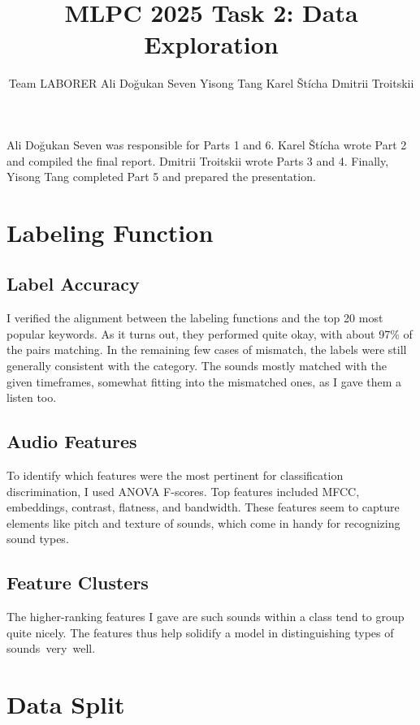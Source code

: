 \documentclass{article}
\title{MLPC 2025 Task 2: Data Exploration}
\author{%
  Team LABORER \AND
  Ali Doğukan Seven
  \And
  Yisong Tang
  \And 
  Karel Štícha
  \AND 
  Dmitrii Troitskii
}
\begin{document}
\maketitle


\begin{contributions}
  Ali Doğukan Seven was responsible for Parts 1 and 6. Karel Štícha wrote Part 2 and compiled the final report. Dmitrii Troitskii wrote Parts 3 and 4. Finally, Yisong Tang completed Part 5 and prepared the presentation.
\end{contributions}
\section{Labeling Function}
\subsection{Label Accuracy}
I verified the alignment between the labeling functions and the top 20 most popular keywords. As it turns out, they performed quite okay, with about 97\% of the pairs matching. In the remaining few cases of mismatch, the labels were still generally consistent with the category. The sounds mostly matched with the given timeframes, somewhat fitting into the mismatched ones, as I gave them a listen too. 

\subsection{Audio Features}
To identify which features were the most pertinent for classification discrimination, I used ANOVA F-scores. Top features included MFCC, embeddings, contrast, flatness, and bandwidth. These features seem to capture elements like pitch and texture of sounds, which come in handy for recognizing sound types. 

\subsection{Feature Clusters}
The higher-ranking features I gave are such sounds within a class tend to group quite nicely. The features thus help solidify a model in distinguishing types of sounds very well.



\section{Data Split}
\end{document}
